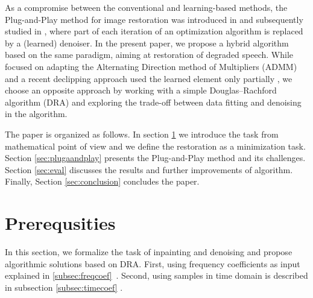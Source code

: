 \documentclass[conference]{IEEEtran}
\newcommand{\todo}[1]{\textcolor{red}{#1}}
\begin{document}
As a compromise between the conventional and learning-based methods, 
the Plug-and-Play method for image restoration was introduced in \cite{Venkatakrishnan2013} and subsequently studied in \cite{Chan2016},
where part of each iteration of an optimization algorithm is replaced by a (learned) denoiser.
In the present paper, we propose a hybrid algorithm based on the same paradigm, aiming at restoration of degraded speech.
While \cite{Chan2016} focused on adapting the Alternating Direction method of Multipliers (ADMM) and a recent declipping approach used the learned element only partially \cite{Tanaka2022}, we choose an opposite approach by working with a simple Douglas--Rachford algorithm (DRA) and exploring the trade-off between data fitting and denoising in the algorithm.



The paper is organized as follows. In section \ref{sec:prereq} we introduce the task from mathematical point of view and we define the restoration as a minimization task.
Section \ref{sec:plugaandplay} presents the Plug-and-Play method and its challenges.
Section \ref{sec:eval} discusses the results and further improvements of algorithm.
Finally, Section \ref{sec:conclusion} concludes the paper.

\section{Prerequsities}\label{sec:prereq} 


In this section, we formalize the task of inpainting and denoising and propose algorithmic solutions based on DRA.
First, using frequency coefficients as input explained in \ref{subsec:freqcoef}~\cite{Mokry2020}.
Second, using samples in time domain is described in subsection \ref{subsec:timecoef} \cite{Mokry2021}.
\end{document}
